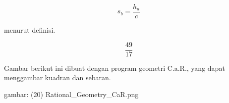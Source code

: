 \documentclass[a4paper,10pt]{article}
\begin{document}
\begin{eulernotebook}
\begin{eulercomment}
\begin{eulercomment}
\begin{eulercomment}
\begin{eulercomment}
\begin{eulercomment}
\begin{eulercomment}
\begin{eulercomment}
\begin{eulercomment}
\begin{eulercomment}
\begin{eulercomment}
\begin{eulercomment}
\begin{eulercomment}
\begin{eulercomment}
\begin{eulercomment}
\begin{eulercomment}
\begin{eulercomment}
\begin{eulercomment}
\begin{eulercomment}
\begin{eulercomment}
\begin{eulercomment}
\begin{eulercomment}
\begin{eulercomment}
\begin{eulercomment}
\begin{eulercomment}
\begin{eulercomment}
\begin{eulercomment}
\begin{eulercomment}
\begin{eulercomment}
\begin{eulercomment}
\begin{eulercomment}
\begin{eulercomment}
\begin{eulercomment}
\begin{eulercomment}
\end{eulercomment}
\begin{eulerformula}
\[
s_b=\frac{h_a}{c}
\]
\end{eulerformula}
\begin{eulercomment}
menurut definisi.
\end{eulercomment}
\begin{eulerformula}
\[
\frac{49}{17}
\]
\end{eulerformula}
\begin{eulercomment}
Gambar berikut ini dibuat dengan program geometri C.a.R., yang dapat
menggambar kuadran dan sebaran.

gambar: (20) Rational\_Geometry\_CaR.png


\end{eulercomment}
\end{eulercomment}
\end{eulercomment}
\end{eulercomment}
\end{eulercomment}
\end{eulercomment}
\end{eulercomment}
\end{eulercomment}
\end{eulercomment}
\end{eulercomment}
\end{eulercomment}
\end{eulercomment}
\end{eulercomment}
\end{eulercomment}
\end{eulercomment}
\end{eulercomment}
\end{eulercomment}
\end{eulercomment}
\end{eulercomment}
\end{eulercomment}
\end{eulercomment}
\end{eulercomment}
\end{eulercomment}
\end{eulercomment}
\end{eulercomment}
\end{eulercomment}
\end{eulercomment}
\end{eulercomment}
\end{eulercomment}
\end{eulercomment}
\end{eulercomment}
\end{eulercomment}
\end{eulercomment}
\end{eulernotebook}
\end{document}
